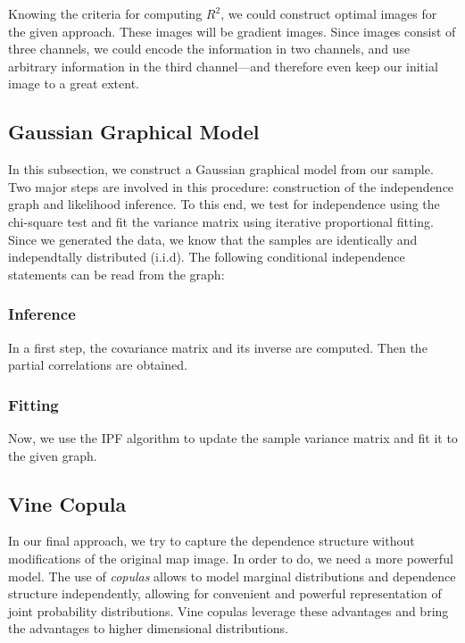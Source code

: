 \documentclass{article}
\begin{document}
Knowing the criteria for computing $R^2$, we could construct optimal
images for the given approach. These images will be gradient
images. Since images consist of three channels, we could encode the
information in two channels, and use arbitrary information in the
third channel---and therefore even keep our initial image to a great
extent.


\subsection{Gaussian Graphical Model}

In this subsection, we construct a Gaussian graphical model from our
sample. Two major steps are involved in this procedure: construction
of the independence graph and likelihood inference. To this end, we
test for independence using the chi-square test and fit the variance
matrix using iterative proportional fitting. Since we generated the
data, we know that the samples are identically and independtally
distributed (i.i.d). The following conditional independence statements
can be read from the graph:


\subsubsection{Inference}

In a first step, the covariance matrix and its inverse are
computed. Then the partial correlations are obtained.


\subsubsection{Fitting}

Now, we use the IPF algorithm to update the sample variance matrix and
fit it to the given graph.

\subsection{Vine Copula}

In our final approach, we try to capture the dependence structure
without modifications of the original map image. In order to do, we
need a more powerful model. The use of \emph{copulas} allows to model
marginal distributions and dependence structure independently,
allowing for convenient and powerful representation of joint
probability distributions. Vine copulas leverage these advantages and
bring the advantages to higher dimensional distributions.
\end{document}

